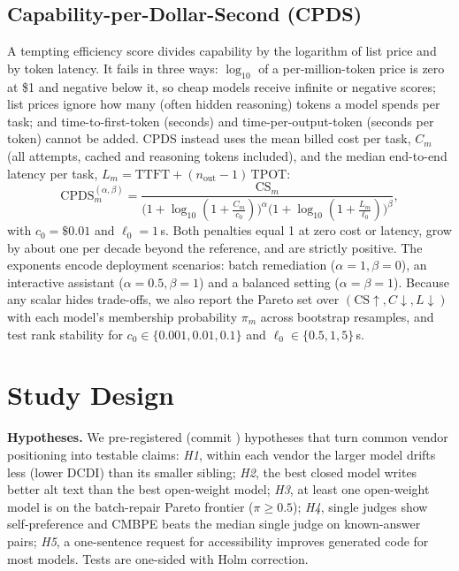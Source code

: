 \documentclass[10pt,conference]{IEEEtran}
\begin{document}
\subsection{Capability-per-Dollar-Second (CPDS)}
A tempting efficiency score divides capability by the logarithm of list price and by token latency. It fails in three ways: $\log_{10}$ of a per-million-token price is zero at \$1 and negative below it, so cheap models receive infinite or negative scores; list prices ignore how many (often hidden reasoning) tokens a model spends per task; and time-to-first-token (seconds) and time-per-output-token (seconds per token) cannot be added. CPDS instead uses the mean billed cost per task, $C_m$ (all attempts, cached and reasoning tokens included), and the median end-to-end latency per task, $L_m=\mathrm{TTFT}+(n_{\mathrm{out}}-1)\,\mathrm{TPOT}$:
\begin{equation}
\mathrm{CPDS}^{(\alpha,\beta)}_m=\frac{\mathrm{CS}_m}{\big(1+\log_{10}(1+\frac{C_m}{c_0})\big)^{\alpha}\big(1+\log_{10}(1+\frac{L_m}{\ell_0})\big)^{\beta}},
\end{equation}
with $c_0=\$0.01$ and $\ell_0=1$\,s. Both penalties equal 1 at zero cost or latency, grow by about one per decade beyond the reference, and are strictly positive. The exponents encode deployment scenarios: batch remediation ($\alpha=1,\beta=0$), an interactive assistant ($\alpha=0.5,\beta=1$) and a balanced setting ($\alpha=\beta=1$). Because any scalar hides trade-offs, we also report the Pareto set over $(\mathrm{CS}\!\uparrow,C\!\downarrow,L\!\downarrow)$ with each model's membership probability $\pi_m$ across bootstrap resamples, and test rank stability for $c_0\in\{0.001,0.01,0.1\}$ and $\ell_0\in\{0.5,1,5\}$\,s.

\section{Study Design}\label{sec:design}

\textbf{Hypotheses.} We pre-registered (commit ) hypotheses that turn common vendor positioning into testable claims: \emph{H1}, within each vendor the larger model drifts less (lower DCDI) than its smaller sibling; \emph{H2}, the best closed model writes better alt text than the best open-weight model; \emph{H3}, at least one open-weight model is on the batch-repair Pareto frontier ($\pi\geq0.5$); \emph{H4}, single judges show self-preference and CMBPE beats the median single judge on known-answer pairs; \emph{H5}, a one-sentence request for accessibility improves generated code for most models. Tests are one-sided with Holm correction.
\end{document}
